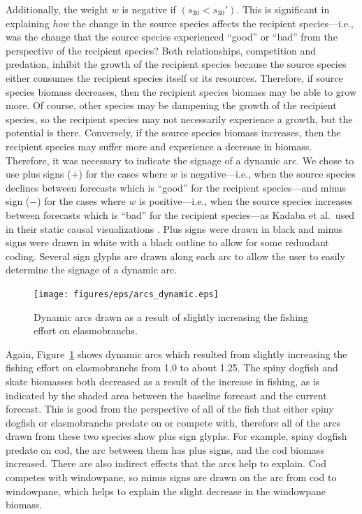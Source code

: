 Additionally, the weight $w$ is negative if $(s_{30} < s_{30}')$.  This is significant in explaining \textit{how} the change in the source species affects the recipient species---i.e., was the change that the source species experienced ``good'' or ``bad'' from the perspective of the recipient species?  Both relationships, competition and predation, inhibit the growth of the recipient species because the source species either consumes the recipient species itself or its resources.  Therefore, if source species biomass decreases, then the recipient species biomass may be able to grow more.  Of course, other species may be dampening the growth of the recipient species, so the recipient species may not necessarily experience a growth, but the potential is there.  Conversely, if the source species biomass increases, then the recipient species may suffer more and experience a decrease in biomass.  Therefore, it was necessary to indicate the signage of a dynamic arc.  We chose to use plus signs ($+$) for the cases where $w$ is negative---i.e., when the source species declines between forecasts which is ``good'' for the recipient species---and minus sign ($-$) for the cases where $w$ is positive---i.e., when the source species increases between forecasts which is ``bad'' for the recipient species---as Kadaba et al.\ used in their static causal visualizations \cite{kadaba2007}.  Plus signs were drawn in black and minus signs were drawn in white with a black outline to allow for some redundant coding.  Several sign glyphs are drawn along each arc to allow the user to easily determine the signage of a dynamic arc.

\begin{figure}[h]
	\centering
	\texttt{[image: figures/eps/arcs\_dynamic.eps]}
	\caption{Dynamic arcs drawn as a result of slightly increasing the fishing effort on elasmobranchs.}
	\label{fig:arcs_dynamic}
\end{figure}

Again, Figure~\ref{fig:arcs_dynamic} shows dynamic arcs which resulted from slightly increasing the fishing effort on elasmobranchs from 1.0 to about 1.25.  The spiny dogfish and skate biomasses both decreased as a result of the increase in fishing, as is indicated by the shaded area between the baseline forecast and the current forecast.  This is good from the perspective of all of the fish that either spiny dogfish or elasmobranchs predate on or compete with, therefore all of the arcs drawn from these two species show plus sign glyphs.  For example, spiny dogfish predate on cod, the arc between them has plus signs, and the cod biomass increased.  There are also indirect effects that the arcs help to explain.  Cod competes with windowpane, so minus signs are drawn on the arc from cod to windowpane, which helps to explain the slight decrease in the windowpane biomass.

